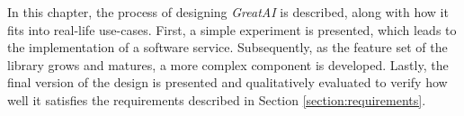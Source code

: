 In this chapter, the process of designing \textit{GreatAI} is described, along with how it fits into real-life use-cases. First, a simple experiment is presented, which leads to the implementation of a software service. Subsequently, as the feature set of the library grows and matures, a more complex component is developed. Lastly, the final version of the design is presented and qualitatively evaluated to verify how well it satisfies the requirements described in Section \ref{section:requirements}.



